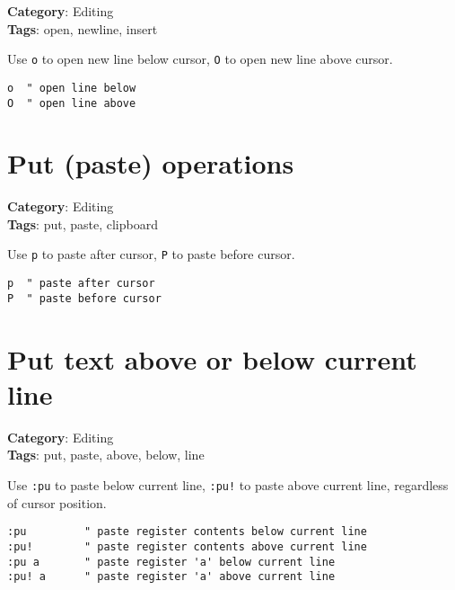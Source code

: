{{{{\textbf{Category}: Editing\\ \textbf{Tags}: open, newline, insert
\vspace{0.5cm}

Use {\footnotesize \Verb§o§} to open new line below cursor, {\footnotesize \Verb§O§} to open new line above cursor.

\begin{Exa*}{}
\begin{Verbatim}[fontsize=\footnotesize, breaklines, breakanywhere]
o  " open line below
O  " open line above
\end{Verbatim}
\end{Exa*}

\section{Put (paste) operations}

\textbf{Category}: Editing\\ \textbf{Tags}: put, paste, clipboard
\vspace{0.5cm}

Use {\footnotesize \Verb§p§} to paste after cursor, {\footnotesize \Verb§P§} to paste before cursor.

\begin{Exa*}{}
\begin{Verbatim}[fontsize=\footnotesize, breaklines, breakanywhere]
p  " paste after cursor
P  " paste before cursor
\end{Verbatim}
\end{Exa*}

\section{Put text above or below current line}

\textbf{Category}: Editing\\ \textbf{Tags}: put, paste, above, below, line
\vspace{0.5cm}

Use {\footnotesize \Verb§:pu§} to paste below current line, {\footnotesize \Verb§:pu!§} to paste above current line, regardless of cursor position.

\begin{Exa*}{}
\begin{Verbatim}[fontsize=\footnotesize, breaklines, breakanywhere]
:pu         " paste register contents below current line
:pu!        " paste register contents above current line
:pu a       " paste register 'a' below current line
:pu! a      " paste register 'a' above current line
\end{Verbatim}
\end{Exa*}

}}}}
